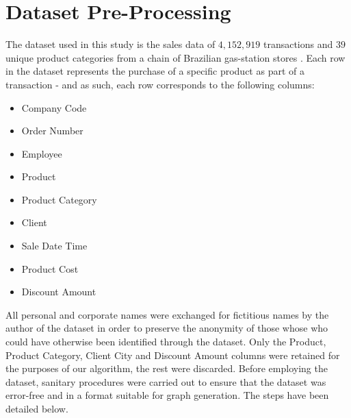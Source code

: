 \section{Dataset Pre-Processing}
The dataset used in this study is the sales data of $4,152,919$ transactions and $39$ unique product categories from a chain of Brazilian gas-station stores .
Each row in the dataset represents the purchase of a specific product as part of a transaction - and as such, each row corresponds to the following columns:
\begin{itemize}
\item Company Code
\item Order Number
\item Employee
\item Product
\item Product Category
\item Client
\item Sale Date Time
\item Product Cost
\item Discount Amount
\end{itemize}
All personal and corporate names were exchanged for fictitious names by the author of the dataset in order to preserve the anonymity of those whose who could have otherwise been identified through the dataset.
Only the Product, Product Category, Client City and Discount Amount columns were retained for the purposes of our algorithm, the rest were discarded.
Before employing the dataset, sanitary procedures were carried out to ensure that the dataset was error-free and in a format suitable for graph generation. The steps have been detailed below.

